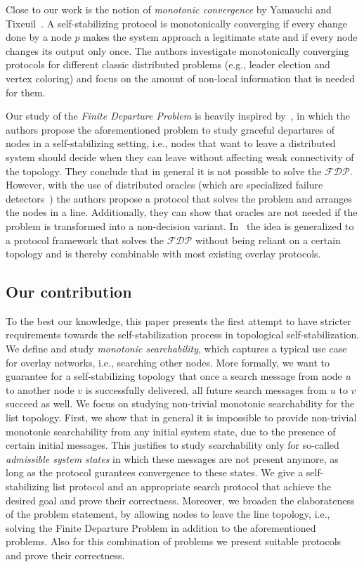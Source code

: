 \documentclass[a4paper,USenglish]{lipics}
\newcommand{\fdp}{$\mathcal{FDP}$\xspace}
\begin{document}
Close to our work is the notion of \emph{monotonic convergence} by Yamauchi and Tixeuil~\cite{YamauchiT10}. A self-stabilizing protocol is monotonically converging if every change done by a node $p$ makes the system approach a legitimate state and if every node changes its output only once. 
The authors investigate monotonically converging protocols for different classic distributed problems (e.g., leader election and vertex coloring) and focus on the amount of non-local information that is needed for them.

Our study of the \emph{Finite Departure Problem} is heavily inspired by~\cite{departure1}, in which the authors propose the aforementioned problem to study graceful departures of nodes in a self-stabilizing setting, i.e., nodes that want to leave a distributed system should decide when they can leave without affecting weak connectivity of the topology. 
They conclude that in general it is not possible to solve the \fdp. 
However, with the use of distributed oracles (which are specialized failure detectors~\cite{ChandraT96}) the authors propose a protocol that solves the problem and arranges the nodes in a line. 
Additionally, they can show that oracles are not needed if the problem is transformed into a non-decision variant. 
In~\cite{KoutsopoulosSS15} the idea is generalized to a protocol framework that solves the \fdp without being reliant on a certain topology and is thereby combinable with most existing overlay protocols.

\subsection{Our contribution}
To the best our knowledge, this paper presents the first attempt to have stricter requirements towards the self-stabilization process in topological self-stabilization.
We define and study \emph{monotonic searchability}, which captures a typical use case for overlay networks, i.e., searching other nodes.
More formally, we want to guarantee for a self-stabilizing topology that once a search message from node $u$ to another node $v$ is successfully delivered, all future search messages from $u$ to $v$ succeed as well.
We focus on studying non-trivial monotonic searchability for the list topology.
First, we show that in general it is impossible to provide non-trivial monotonic searchability from any initial system state, due to the presence of certain initial messages.
This justifies to study searchability only for so-called \emph{admissible system states} in which  these messages are not present anymore, as long as the protocol gurantees convergence to these states.
We give a self-stabilizing list protocol and an appropriate search protocol that achieve the desired goal and prove their correctness.
Moreover, we broaden the elaborateness of the problem statement, by allowing nodes to leave the line topology, i.e., solving the Finite Departure Problem in addition to the aforementioned problems. 
Also for this combination of problems we present suitable protocols and prove their correctness. 
\end{document}
